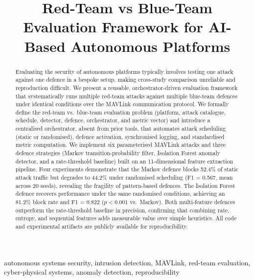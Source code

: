 \documentclass[conference]{IEEEtran}
\begin{document}
\title{Red-Team vs Blue-Team Evaluation Framework for AI-Based Autonomous Platforms}

\author{
\and
{}
}

\maketitle

\begin{abstract}
Evaluating the security of autonomous platforms typically involves testing one attack against one defence in a bespoke setup, making cross-study comparison unreliable and reproduction difficult.
We present a reusable, orchestrator-driven evaluation framework that systematically runs multiple red-team attacks against multiple blue-team defences under identical conditions over the MAVLink communication protocol.
We formally define the red-team vs.\ blue-team evaluation problem (platform, attack catalogue, schedule, detector, defence, orchestrator, and metric vector) and introduce a centralised orchestrator, absent from prior tools, that automates attack scheduling (static or randomised), defence activation, synchronised logging, and standardised metric computation.
We implement six parameterised MAVLink attacks and three defence strategies (Markov transition-probability filter, Isolation Forest anomaly detector, and a rate-threshold baseline) built on an 11-dimensional feature extraction pipeline.
Four experiments demonstrate that the Markov defence blocks 52.4\% of static attack traffic but degrades to 44.2\% under randomised scheduling (F1 = 0.567, mean across 20 seeds), revealing the fragility of pattern-based defences.
The Isolation Forest defence recovers performance under the same randomised conditions, achieving an 81.2\% block rate and F1 = 0.822 ($p < 0.001$ vs.\ Markov).
Both multi-feature defences outperform the rate-threshold baseline in precision, confirming that combining rate, entropy, and sequential features adds measurable value over simple heuristics.
All code and experimental artifacts are publicly available for reproducibility.
\end{abstract}

\begin{IEEEkeywords}
autonomous systems security, intrusion detection, MAVLink, red-team evaluation, cyber-physical systems, anomaly detection, reproducibility
\end{IEEEkeywords}











\end{document}
